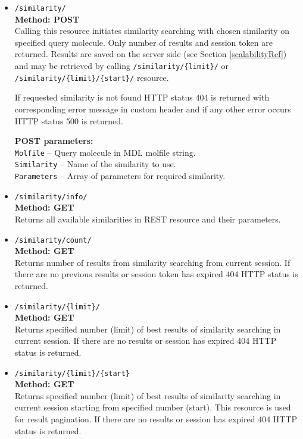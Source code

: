 \documentclass[thesis=M,english]{FITthesis}[2012/10/20]
\begin{document}
\begin{itemize}
\item \texttt{/similarity/} \\
\textbf{Method: POST} \\ 
Calling this resource initiates similarity searching with chosen similarity on specified query molecule. Only number of results and session token are returned. Results are saved on the server side (see Section \ref{scalabilityRef}) and may be retrieved by calling \texttt{/similarity/\{limit\}/} or \texttt{/similarity/\{limit\}/\{start\}/} resource.

If requested similarity is not found HTTP status 404 is returned with corresponding error message in custom header and if any other error occurs HTTP status 500 is returned.

\textbf{POST parameters:} \\
\texttt{Molfile} – Query molecule in MDL molfile string. \\
\texttt{Similarity} – Name of the similarity to use. \\
\texttt{Parameters} – Array of parameters for required similarity. 


\item \texttt{/similarity/info/} \\
\textbf{Method: GET} \\ 
Returns all available similarities in REST resource and their parameters.  

\item \texttt{/similarity/count/} \\
\textbf{Method: GET} \\ 
Returns number of results from similarity searching from current session. If there are no previous results or session token has expired 404 HTTP status is returned. 

\item \texttt{/similarity/\{limit\}/} \\
\textbf{Method: GET} \\ 
Returns specified number (limit) of best results of similarity searching in current session. If there are no results or session has expired 404 HTTP status is returned. 

\item \texttt{/similarity/\{limit\}/\{start\}} \\
\textbf{Method: GET} \\ 
Returns specified number (limit) of best results of similarity searching in current session starting from specified number (start). This resource is used for result pagination. If there are no results or session has expired 404 HTTP status is returned. 


\end{itemize}
\end{document}
